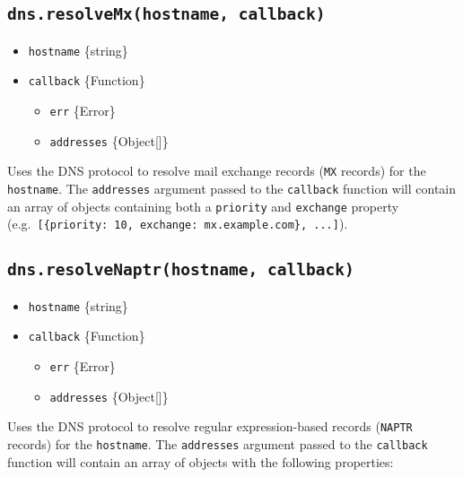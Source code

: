 \subsection{\texorpdfstring{\texttt{dns.resolveMx(hostname,\ callback)}}{dns.resolveMx(hostname, callback)}}\label{dns.resolvemxhostname-callback}

\begin{itemize}
\tightlist
\item
  \texttt{hostname} \{string\}
\item
  \texttt{callback} \{Function\}

  \begin{itemize}
  \tightlist
  \item
    \texttt{err} \{Error\}
  \item
    \texttt{addresses} \{Object{[}{]}\}
  \end{itemize}
\end{itemize}

Uses the DNS protocol to resolve mail exchange records (\texttt{MX}
records) for the \texttt{hostname}. The \texttt{addresses} argument
passed to the \texttt{callback} function will contain an array of
objects containing both a \texttt{priority} and \texttt{exchange}
property
(e.g.~\texttt{{[}\{priority:\ 10,\ exchange:\ \textquotesingle{}mx.example.com\textquotesingle{}\},\ ...{]}}).

\subsection{\texorpdfstring{\texttt{dns.resolveNaptr(hostname,\ callback)}}{dns.resolveNaptr(hostname, callback)}}\label{dns.resolvenaptrhostname-callback}

\begin{itemize}
\tightlist
\item
  \texttt{hostname} \{string\}
\item
  \texttt{callback} \{Function\}

  \begin{itemize}
  \tightlist
  \item
    \texttt{err} \{Error\}
  \item
    \texttt{addresses} \{Object{[}{]}\}
  \end{itemize}
\end{itemize}

Uses the DNS protocol to resolve regular expression-based records
(\texttt{NAPTR} records) for the \texttt{hostname}. The
\texttt{addresses} argument passed to the \texttt{callback} function
will contain an array of objects with the following properties:

